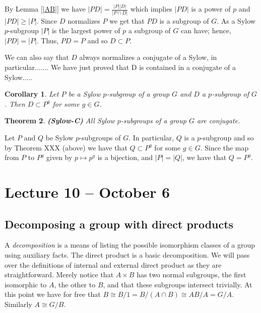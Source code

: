 \documentclass[letterpaper]{article}
\newtheorem{theorem}{Theorem}[section]
\newtheorem{corollary}[theorem]{Corollary}
\newenvironment{proof}[1][Proof]{\begin{trivlist}
\item[\hskip \labelsep {\bfseries #1}]}{\end{trivlist}}
\begin{document}
\begin{proof}
By Lemma \ref{|AB|} we have $|PD|=\frac{|P||D|}{|P \cap D|}$ which
implies $|PD|$ is a power of $p$ and $|PD| \geq |P|$. Since $D$
normalizes $P$ we get that $PD$ is a subgroup of $G$. As a Sylow
$p$-subgroup $|P|$ is the largest power of $p$ a subgroup of $G$
can have; hence, $|PD|=|P|$. Thus, $PD=P$ and so $D \subset P$.
\end{proof}

We can also say that $D$ always normalizes a conjugate of a Sylow,
in particular.......  We have just proved that D is contained in a
conjugate of a Sylow.....

\begin{corollary}
Let $P$ be a Sylow $p$-subgroup of a group $G$ and $D$ a $p$-subgroup
of $G$. Then $D \subset P^g$ for some $g \in G$.
\end{corollary}

\begin{theorem}
\emph{\textbf{(Sylow-C)}}
All Sylow $p$-subgroups of a group $G$ are conjugate.
\end{theorem}

\begin{proof}
Let $P$ and $Q$ be Sylow $p$-subgroups of $G$. In particular, $Q$
is a $p$-subgroup and so by Theorem XXX (above) we have that $Q
\subset P^g$ for some $g \in G$. Since the map from $P$ to $P^g$
given by $p \mapsto p^g$ is a bijection, and $|P|=|Q|$, we have
that $Q=P^g$.
\end{proof}

\section{Lecture 10 -- October 6}

\subsection{Decomposing a group with direct products}

A \emph{decomposition} is a means of listing the possible isomorphism
classes of a group using auxiliary facts. The direct product is a
basic decomposition. We will pass over the definitions of internal
and external direct product as they are straightforward. Merely
notice that $A \times B$ has two normal subgroups, the first
isomorphic to $A$, the other to $B$, and that these subgroups
intersect trivially. At this point we have for free that $B \cong
B/1 = B/(A\cap B) \cong AB/A = G/A$. Similarly $A \cong G/B$.
\end{document}
